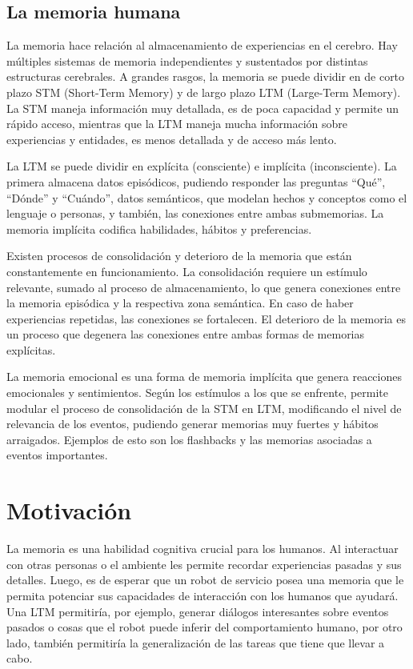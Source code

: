 \subsection{La memoria humana}

La memoria hace relación al almacenamiento de experiencias en el cerebro. Hay múltiples sistemas de memoria independientes y sustentados por distintas estructuras cerebrales. A grandes rasgos, la memoria se puede dividir en de corto plazo STM (Short-Term Memory) y de largo plazo LTM (Large-Term Memory). La STM maneja información muy detallada, es de poca capacidad y permite un rápido acceso, mientras que la LTM maneja mucha información sobre experiencias y entidades, es menos detallada y de acceso más lento\cite{Eichenbaum:2008}.

La LTM se puede dividir en explícita (consciente) e implícita (inconsciente). La primera almacena datos episódicos, pudiendo responder las preguntas ``Qué'', ``Dónde'' y ``Cuándo'', datos semánticos, que modelan hechos y conceptos como el lenguaje o personas, y también, las conexiones entre ambas submemorias. La memoria implícita codifica habilidades, hábitos y preferencias.

Existen procesos de consolidación y deterioro de la memoria que están constantemente en funcionamiento. La consolidación requiere un estímulo relevante, sumado al proceso de almacenamiento, lo que genera conexiones entre la memoria episódica y la respectiva zona semántica. En caso de haber experiencias repetidas, las conexiones se fortalecen. El deterioro de la memoria es un proceso que degenera las conexiones entre ambas formas de memorias explícitas.

La memoria emocional es una forma de memoria implícita que genera reacciones emocionales y sentimientos. Según los estímulos a los que se enfrente, permite modular el proceso de consolidación de la STM en LTM, modificando el nivel de relevancia de los eventos, pudiendo generar memorias muy fuertes y hábitos arraigados. Ejemplos de esto son los flashbacks y las memorias asociadas a eventos importantes.



\section{Motivación}

La memoria es una habilidad cognitiva crucial para los humanos. Al interactuar con otras personas o el ambiente les permite recordar experiencias pasadas y sus detalles. Luego, es de esperar que un robot de servicio posea una memoria que le permita potenciar sus capacidades de interacción con los humanos que ayudará\cite{Vijayakumar2014}. Una LTM permitiría, por ejemplo, generar diálogos interesantes sobre eventos pasados o cosas que el robot puede inferir del comportamiento humano, por otro lado, también permitiría la generalización de las tareas que tiene que llevar a cabo.


